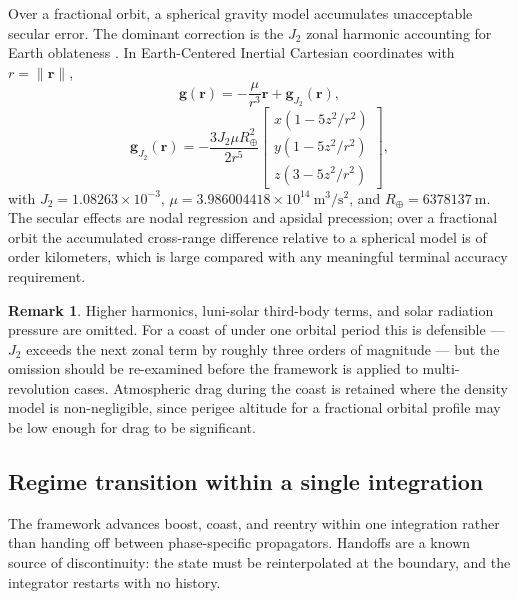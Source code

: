 \documentclass[11pt,a4paper]{article}
\theoremstyle{definition}
\newtheorem{remark}[theorem]{Remark}
\numberwithin{equation}{section}
\begin{document}
Over a fractional orbit, a spherical gravity model accumulates unacceptable secular error. The dominant correction is the $J_2$ zonal harmonic accounting for Earth oblateness \cite{vallado2013}. In Earth-Centered Inertial Cartesian coordinates with $r = \|\mathbf{r}\|$,
\begin{equation}
\label{eq:gravity}
\mathbf{g}(\mathbf{r}) = -\frac{\mu}{r^3}\mathbf{r} + \mathbf{g}_{J_2}(\mathbf{r}),
\end{equation}
\begin{equation}
\label{eq:j2}
\mathbf{g}_{J_2}(\mathbf{r}) = -\frac{3 J_2 \mu R_\oplus^2}{2 r^5}
\begin{bmatrix}
x\left(1 - 5 z^2/r^2\right) \\[2pt]
y\left(1 - 5 z^2/r^2\right) \\[2pt]
z\left(3 - 5 z^2/r^2\right)
\end{bmatrix},
\end{equation}
with $J_2 = 1.08263\times10^{-3}$, $\mu = 3.986004418\times10^{14}\ \text{m}^3/\text{s}^2$, and $R_\oplus = 6378137\ \text{m}$. The secular effects are nodal regression and apsidal precession; over a fractional orbit the accumulated cross-range difference relative to a spherical model is of order kilometers, which is large compared with any meaningful terminal accuracy requirement.

\begin{remark}
Higher harmonics, luni-solar third-body terms, and solar radiation pressure are omitted. For a coast of under one orbital period this is defensible --- $J_2$ exceeds the next zonal term by roughly three orders of magnitude --- but the omission should be re-examined before the framework is applied to multi-revolution cases. Atmospheric drag during the coast is retained where the density model is non-negligible, since perigee altitude for a fractional orbital profile may be low enough for drag to be significant.
\end{remark}

\subsection{Regime transition within a single integration}
\label{sec:transition}

The framework advances boost, coast, and reentry within one integration rather than handing off between phase-specific propagators. Handoffs are a known source of discontinuity: the state must be reinterpolated at the boundary, and the integrator restarts with no history.
\end{document}
